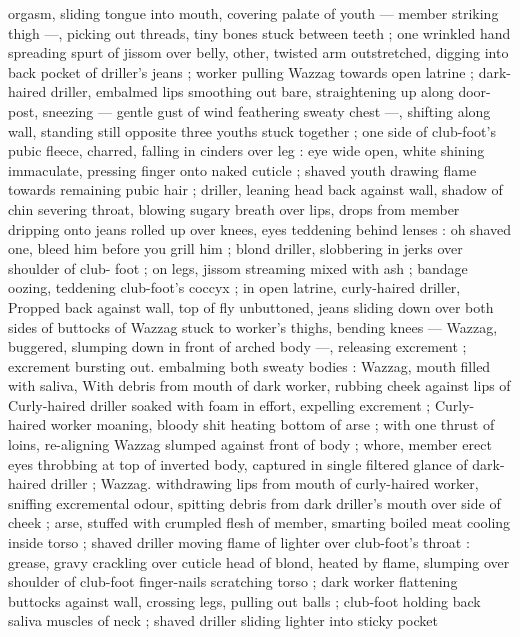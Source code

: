 orgasm, sliding tongue into mouth, covering palate of youth --- 
member striking thigh ---, picking out threads, tiny bones stuck 
between teeth ; one wrinkled hand spreading spurt of jissom over 
belly, other, twisted arm outstretched, digging into back pocket of 
driller's jeans ; worker pulling Wazzag towards open latrine ; dark- 
haired driller, embalmed lips smoothing out bare, straightening up 
along door-post, sneezing --- gentle gust of wind feathering sweaty 
chest ---, shifting along wall, standing still opposite three youths 
stuck together ; one side of club-foot's pubic fleece, charred, falling 
in cinders over leg : eye wide open, white shining immaculate, 
pressing finger onto naked cuticle ; shaved youth drawing flame 
towards remaining pubic hair ; driller, leaning head back against wall, 
shadow of chin severing throat, blowing sugary breath over lips, 
drops from member dripping onto jeans rolled up over knees, eyes 
teddening behind lenses : {\gl}{\thd}oh shaved one, bleed him before you 
grill him{\thd}{\gr} ; blond driller, slobbering in jerks over shoulder of club- 
foot ; on legs, jissom streaming mixed with ash ; bandage oozing, 
teddening club-foot's coccyx ; in open latrine, curly-haired driller, 
Propped back against wall, top of fly unbuttoned, jeans sliding down 
over both sides of buttocks of Wazzag stuck to worker's thighs, 
bending knees --- Wazzag, buggered, slumping down in front of 
arched body ---, releasing excrement ; excrement bursting out. 
embalming both sweaty bodies : Wazzag, mouth filled with saliva, 
With debris from mouth of dark worker, rubbing cheek against lips of 
Curly-haired driller soaked with foam in effort, expelling excrement ; 
Curly-haired worker moaning, bloody shit heating bottom of arse ; 
with one thrust of loins, re-aligning Wazzag slumped against front of 
body ; whore, member erect eyes throbbing at top of inverted body, 
captured in single filtered glance of dark-haired driller ; Wazzag. 
withdrawing lips from mouth of curly-haired worker, sniffing 
excremental odour, spitting debris from dark driller's mouth over side 
of cheek ; arse, stuffed with crumpled flesh of member, smarting 
boiled meat cooling inside torso ; shaved driller moving flame of 
lighter over club-foot's throat : grease, gravy crackling over cuticle 
head of blond, heated by flame, slumping over shoulder of club-foot 
finger-nails scratching torso ; dark worker flattening buttocks against 
wall, crossing legs, pulling out balls ; club-foot holding back saliva 
muscles of neck ; shaved driller sliding lighter into sticky pocket 
